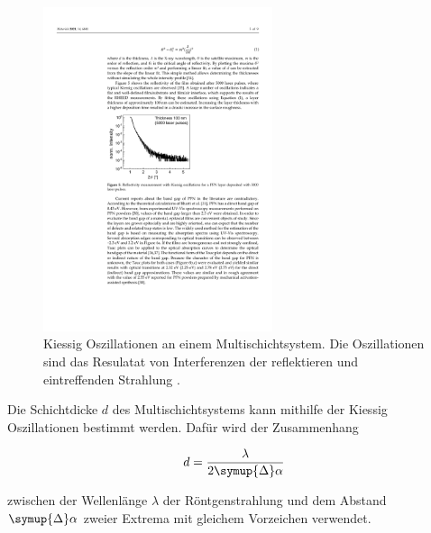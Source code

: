 \begin{figure}
    \centering
    \includegraphics[width=0.6\textwidth]{content/pics/kiessig_oscillation.pdf}
    \caption{Kiessig Oszillationen an einem Multischichtsystem. Die Oszillationen sind das Resulatat von Interferenzen der reflektieren und eintreffenden %
    Strahlung \cite{kiessig_oscillation}.}
    \label{fig:kiessig_oscillation}
\end{figure}

Die Schichtdicke $d$ des Multischichtsystems kann mithilfe der Kiessig Oszillationen bestimmt werden. Dafür wird der Zusammenhang

\begin{equation}
    d = \frac{\lambda}{2\symup{\Delta}\alpha}
    \label{eq:Schichtdicke}
\end{equation}

zwischen der Wellenlänge $\lambda$ der Röntgenstrahlung und dem Abstand $\symup{\Delta}\alpha$ zweier Extrema mit gleichem Vorzeichen verwendet.

